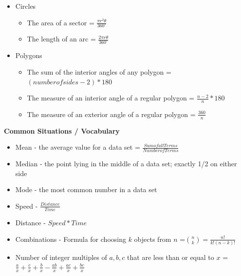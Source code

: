 \documentclass[11pt,letterpaper]{article}
\begin{document}
\begin{minipage}{\textwidth}
\begin{itemize}
\begin{itemize}
\begin{itemize}
               \end{itemize}
          \end{itemize}
          \item Circles
          \begin{itemize}
               \item The area of a sector = $\frac{\pi r^2\theta}{360^{\circ}}$
               \item The length of an arc = $\frac{2\pi r\theta}{360^{\circ}}$
          \end{itemize}
          \item Polygons
          \begin{itemize}
               \item The sum of the interior angles of any polygon = $(number of sides-2) * 180$
               \item The measure of an interior angle of a regular polygon = $\frac{n-2}{n} * 180$
               \item The measure of an exterior angle of a regular polygon = $\frac{360}{n}$
          \end{itemize}
        \end{itemize} 
\end{minipage}

\vspace{0.4cm}

\begin{minipage}{\textwidth}
     \noindent \textbf{Common Situations / Vocabulary}
     \begin{itemize}
          \item Mean - the average value for a data set = $\frac{Sum of all Terms}{Number of Terms}$
          \item Median - the point lying in the middle of a data set; exactly 1/2 on either side
          \item Mode - the most common number in a data set
          \item Speed - $\frac{Distance}{Time}$
          \item Distance - $Speed * Time$
          \item Combinations - Formula for choosing $k$ objects from $n$ =${{n}\choose {k}} = \frac {n!} {k!(n-k)!}$
          \item Number of integer multiples of $a,b,c$ that are less than or equal to $x$ = $\frac{a}{x} + \frac{c}{x} + \frac{b}{x} -\frac{ab}{x} + \frac{ac}{x} + \frac{bc}{x} $
     \end{itemize}
\end{minipage}
\end{document}
